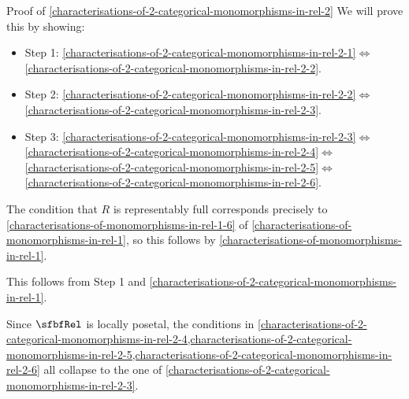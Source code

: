 \begin{Proof}{Proof of \cref{characterisations-of-2-categorical-monomorphisms-in-rel-2}}%
    We will prove this by showing:
    \begin{itemize}
        \item Step 1: \cref{characterisations-of-2-categorical-monomorphisms-in-rel-2-1}$\iff$\cref{characterisations-of-2-categorical-monomorphisms-in-rel-2-2}.
        \item Step 2: \cref{characterisations-of-2-categorical-monomorphisms-in-rel-2-2}$\iff$\cref{characterisations-of-2-categorical-monomorphisms-in-rel-2-3}.
        \item Step 3: \cref{characterisations-of-2-categorical-monomorphisms-in-rel-2-3}$\iff$\cref{characterisations-of-2-categorical-monomorphisms-in-rel-2-4}$\iff$\cref{characterisations-of-2-categorical-monomorphisms-in-rel-2-5}$\iff$\cref{characterisations-of-2-categorical-monomorphisms-in-rel-2-6}.
    \end{itemize}

    The condition that $R$ is representably full corresponds precisely to \cref{characterisations-of-monomorphisms-in-rel-1-6} of \cref{characterisations-of-monomorphisms-in-rel-1}, so this follows by \cref{characterisations-of-monomorphisms-in-rel-1}.

    This follows from Step 1 and \cref{characterisations-of-2-categorical-monomorphisms-in-rel-1}.

    Since $\sfbfRel$ is locally posetal, the conditions in \cref{characterisations-of-2-categorical-monomorphisms-in-rel-2-4,characterisations-of-2-categorical-monomorphisms-in-rel-2-5,characterisations-of-2-categorical-monomorphisms-in-rel-2-6} all collapse to the one of \cref{characterisations-of-2-categorical-monomorphisms-in-rel-2-3}.
\end{Proof}
